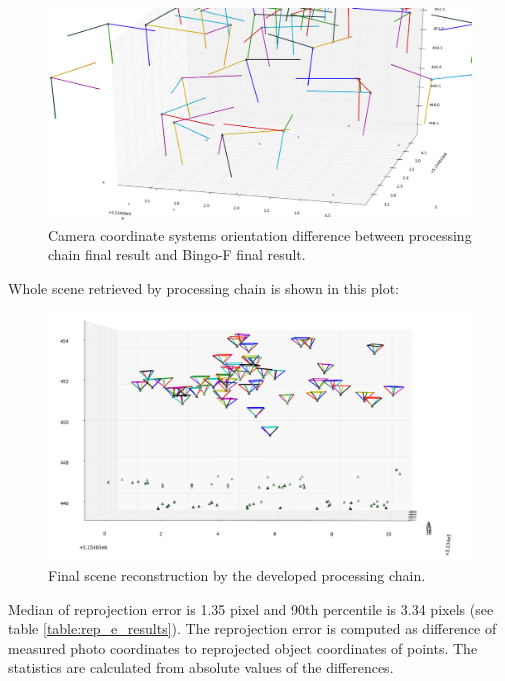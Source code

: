 \documentclass[a4paper,12pt]{article}
\begin{document}
\begin{center}
 \begin{figure}[!h]
    \includegraphics[scale=0.28]{figures/result.png}
     \caption{Camera coordinate systems orientation difference between processing chain final result and Bingo-F final result.}
    \label{fig:cam_diff}
\end{figure}
\end{center}


Whole scene retrieved by processing chain is shown in this plot:

\begin{center}
 \begin{figure}[!h]
      \includegraphics[scale=0.35]{figures/result_all.png}
     \caption{Final scene reconstruction by the developed processing chain.}
    \label{fig:final_result}
\end{figure}
\end{center}


Median of reprojection error is 1.35 pixel and 90th percentile is 3.34 pixels (see table \ref{table:rep_e_results}).
The reprojection error is computed as difference of measured photo coordinates to 
reprojected object coordinates of points. The statistics are calculated from absolute values of the differences. 
\end{document}

